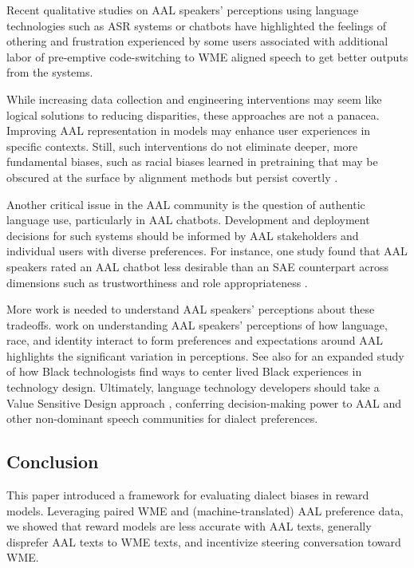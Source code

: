 Recent qualitative studies on AAL speakers' perceptions using language technologies such as ASR systems \cite{mengesha_i_2021,wenzel2023microaggressions} or chatbots \cite{cunningham_understanding_2024} have highlighted the feelings of othering and frustration experienced by some users associated with additional labor of pre-emptive code-switching to WME aligned speech to get better outputs from the systems. 

While increasing data collection and engineering interventions may seem like logical solutions to reducing disparities, these approaches are not a panacea. Improving AAL representation in models may enhance user experiences in specific contexts. Still, such interventions do not eliminate deeper, more fundamental biases, such as racial biases learned in pretraining that may be obscured at the surface by alignment methods but persist covertly \cite{hofmann_dialect_2024}.

Another critical issue in the AAL community is the question of authentic language use, particularly in AAL chatbots. Development and deployment decisions for such systems should be informed by AAL stakeholders \cite{brewer2023,alim2016} and individual users with diverse preferences. For instance, one study found that AAL speakers rated an AAL chatbot less desirable than an SAE counterpart across dimensions such as trustworthiness and role appropriateness \cite{finch_finding_2025}.

More work is needed to understand AAL speakers' perceptions about these tradeoffs.  work on understanding AAL speakers' perceptions of how language, race, and identity interact to form preferences and expectations around AAL highlights the significant variation in perceptions. See also \citet{egede_for_2024} for an expanded study of how Black technologists find ways to center lived Black experiences in technology design.
Ultimately, language technology developers should take a Value Sensitive Design approach \cite{friedman1996vsd}, conferring decision-making power to AAL and other non-dominant speech communities for dialect preferences.

\subsection{Conclusion}
This paper introduced a framework for evaluating dialect biases in reward models. Leveraging paired WME and (machine-translated) AAL preference data, we showed that reward models are less accurate with AAL texts, generally disprefer AAL texts to WME texts, and incentivize steering conversation toward WME. 

